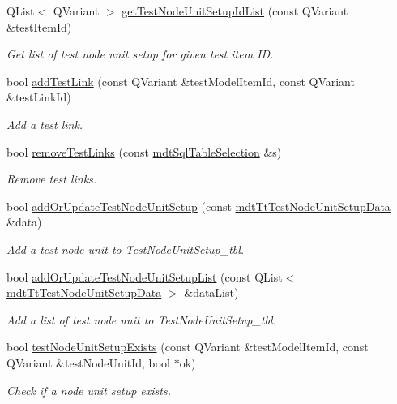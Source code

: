 \begin{DoxyCompactItemize}
Q\-List$<$ Q\-Variant $>$ \hyperlink{classmdt_tt_test_model_item_a5db99142e311591716f80d5bf44559ad}{get\-Test\-Node\-Unit\-Setup\-Id\-List} (const Q\-Variant \&test\-Item\-Id)
\begin{DoxyCompactList}\small\item\em Get list of test node unit setup for given test item I\-D. \end{DoxyCompactList}\item 
bool \hyperlink{classmdt_tt_test_model_item_a4084538ebd5e7b4f3df1fcb97f35c86f}{add\-Test\-Link} (const Q\-Variant \&test\-Model\-Item\-Id, const Q\-Variant \&test\-Link\-Id)
\begin{DoxyCompactList}\small\item\em Add a test link. \end{DoxyCompactList}\item 
bool \hyperlink{classmdt_tt_test_model_item_ab9c5c75f887d846e6079841d08a6ec3f}{remove\-Test\-Links} (const \hyperlink{classmdt_sql_table_selection}{mdt\-Sql\-Table\-Selection} \&s)
\begin{DoxyCompactList}\small\item\em Remove test links. \end{DoxyCompactList}\item 
bool \hyperlink{classmdt_tt_test_model_item_a7aa8e5314eb09a5f56c9367c9f7eff74}{add\-Or\-Update\-Test\-Node\-Unit\-Setup} (const \hyperlink{classmdt_tt_test_node_unit_setup_data}{mdt\-Tt\-Test\-Node\-Unit\-Setup\-Data} \&data)
\begin{DoxyCompactList}\small\item\em Add a test node unit to Test\-Node\-Unit\-Setup\-\_\-tbl. \end{DoxyCompactList}\item 
bool \hyperlink{classmdt_tt_test_model_item_aebacf1463972c5eb6db1cd16eebcf7da}{add\-Or\-Update\-Test\-Node\-Unit\-Setup\-List} (const Q\-List$<$ \hyperlink{classmdt_tt_test_node_unit_setup_data}{mdt\-Tt\-Test\-Node\-Unit\-Setup\-Data} $>$ \&data\-List)
\begin{DoxyCompactList}\small\item\em Add a list of test node unit to Test\-Node\-Unit\-Setup\-\_\-tbl. \end{DoxyCompactList}\item 
bool \hyperlink{classmdt_tt_test_model_item_aaab456933a7b5996002243cd7debe5d8}{test\-Node\-Unit\-Setup\-Exists} (const Q\-Variant \&test\-Model\-Item\-Id, const Q\-Variant \&test\-Node\-Unit\-Id, bool $\ast$ok)
\begin{DoxyCompactList}\small\item\em Check if a node unit setup exists. \end{DoxyCompactList}\item 

\end{DoxyCompactItemize}
